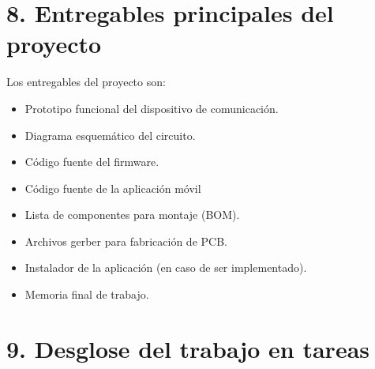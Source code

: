 \documentclass[
11pt, %
]{charter}
\begin{document}
\section{8. Entregables principales del proyecto}
\label{sec:entregables}
Los entregables del proyecto son:

\begin{itemize}
	\item Prototipo funcional del dispositivo de comunicación.
	\item Diagrama esquemático del circuito.
	\item Código fuente del firmware.
	\item Código fuente de la aplicación móvil
	\item Lista de componentes para montaje (BOM).
	\item Archivos gerber para fabricación de PCB.
	\item Instalador de la aplicación (en caso de ser implementado).
	\item Memoria final de trabajo.
\end{itemize}

\section{9. Desglose del trabajo en tareas}
\label{sec:wbs}
\end{document}
